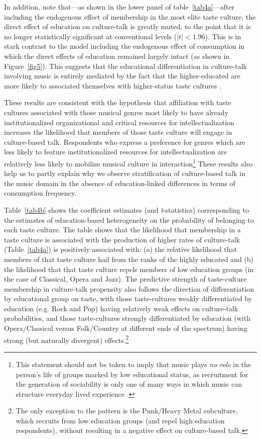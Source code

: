 \documentclass[11pt]{article}
\begin{document}
In addition, note that---as shown in the lower panel of table~\ref{tab4a}---after including the endogenous effect of membership in the most elite taste culture, the direct effect of education on culture-talk is greatly muted, to the point that it is no longer statistically significant at conventional levels ($|t|<1.96$).  This is in stark contrast to the model including the endogenous effect of consumption in which the direct effects of education remained largely intact (as shown in Figure~\ref{fig5}).  This suggests that the educational differentiation in culture-talk involving music is entirely mediated by the fact that the higher-educated are more likely to associated themselves with higher-status taste cultures \citep{gans99, bourdieu84}. 

These results are consistent with the hypothesis that affiliation with taste cultures associated with those musical genres most likely to have already institutionalized organizational and critical resources for intellectualization increases the likelihood that members of those taste culture will engage in culture-based talk. Respondents who express a preference for genres which are less likely to feature institutionalized resources for intellectualization are relatively less likely to mobilize musical culture in interaction\footnote{This statement should not be taken to imply that music plays \emph{no role} in the person's life of groups marked by low educational status, as recruitment for the generation of sociability is only one of many ways in which music can structure everyday lived experience \citep{denora00}.}   These results also help us to partly explain why we observe stratification of culture-based talk in the music domain in the absence of education-linked differences in terms of consumption frequency.  

Table~\ref{tab4b} shows the coefficient estimates (and \emph{t}-statistics) corresponding to the estimates of education-based heterogeneity on the probability of belonging to each taste culture.  The table shows that the likelihood that membership in a taste culture is associated with the production of higher rates of culture-talk (Table~\ref{tab4a}) is positively associated with: (a) the relative likelihood that members of that taste culture hail from the ranks of the highly educated and (b) the likelihood that that taste culture repels members of low education groups (in the case of Classical, Opera and Jazz).  The predictive strength of taste-culture membership in culture-talk propensity also follows the direction of differentiation by educational group on taste, with those taste-cultures weakly differentiated by education (e.g. Rock and Pop) having relatively weak effects on culture-talk probabilities, and those taste-cultures strongly differentiated by education (with Opera/Classical versus Folk/Country at different ends of the spectrum) having strong (but naturally divergent) effects.\footnote{The only exception to the pattern is the Punk/Heavy Metal subculture, which recruits from low education groups (and repel high education respondents), without resulting in a negative effect on culture-based talk.}
\end{document}
